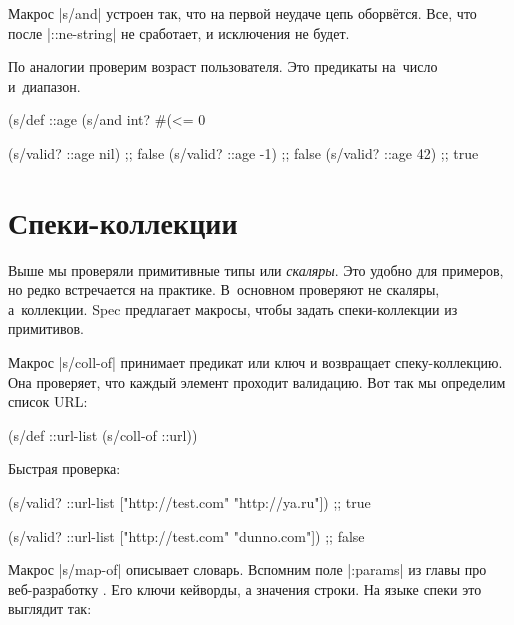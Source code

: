 Макрос \spverb|s/and| устроен так, что на первой неудаче цепь
оборв\"{е}тся. Все, что после \spverb|::ne-string| не сработает, и исключения не
будет.

По аналогии проверим возраст пользователя. Это предикаты на~число и~диапазон.


\begin{english}
  \begin{clojure}
(s/def ::age
  (s/and int? #(<= 0 %

(s/valid? ::age nil) ;; false
(s/valid? ::age -1)  ;; false
(s/valid? ::age 42)  ;; true
  \end{clojure}
\end{english}

\section{Спеки-коллекции}


Выше мы проверяли примитивные типы или \emph{скаляры}. Это удобно для примеров,
но редко встречается на практике. В~основном проверяют не скаляры,
а~коллекции. Spec предлагает макросы, чтобы задать спеки-коллекции из
примитивов.


Макрос \spverb|s/coll-of| принимает предикат или ключ и возвращает
спеку-коллекцию. Она проверяет, что каждый элемент проходит валидацию. Вот так
мы определим список URL:

\begin{english}
  \begin{clojure}
(s/def ::url-list (s/coll-of ::url))
  \end{clojure}
\end{english}

\noindent
Быстрая проверка:

\begin{english}
  \begin{clojure}
(s/valid? ::url-list ["http://test.com" "http://ya.ru"])
;; true

(s/valid? ::url-list ["http://test.com" "dunno.com"])
;; false
  \end{clojure}
\end{english}


Макрос \spverb|s/map-of| описывает словарь. Вспомним поле \spverb|:params| из
главы про веб-разработку . Его ключи кейворды, а значения
строки. На языке спеки это выглядит так:

